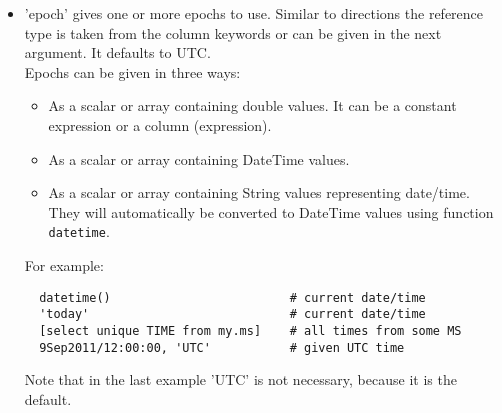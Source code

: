 \begin{itemize}
\item 'epoch' gives one or more epochs to use. Similar to
  directions the reference type is taken from the column keywords or
  can be given in the next argument. It defaults to UTC.
\\Epochs can be given in three ways:
  \begin{itemize}
    \item As a scalar or array containing double values. It can be a
      constant expression or a column (expression).
    \item As a scalar or array containing DateTime values.
    \item As a scalar or array containing String values representing
      date/time. They will automatically be converted to DateTime
      values using function \texttt{datetime}. 
  \end{itemize}
  For example:
\begin{verbatim}
  datetime()                         # current date/time
  'today'                            # current date/time
  [select unique TIME from my.ms]    # all times from some MS
  9Sep2011/12:00:00, 'UTC'           # given UTC time
\end{verbatim}
Note that in the last example 'UTC' is not necessary, because it is
the default.


\end{itemize}
